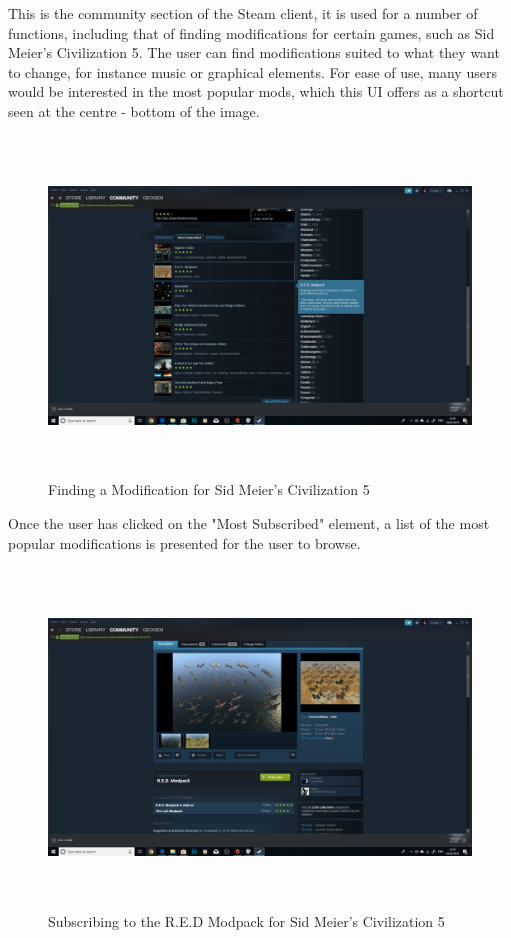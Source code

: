This is the community section of the Steam client, it is used for a number of functions, including that of finding modifications for certain games, such as Sid Meier's Civilization 5. The user can find modifications suited to what they want to change, for instance music or graphical elements. For ease of use, many users would be interested in the most popular mods, which this UI offers as a shortcut seen at the centre - bottom of the image. 

\begin{figure}[H]
\includegraphics[width=16cm,height=9cm]{Screenshots/SteamScreenShots/FindingAModForCivilisation5.png}
\caption{Finding a Modification for Sid Meier's Civilization 5}    
\end{figure}

Once the user has clicked on the "Most Subscribed" element, a list of the most popular modifications is presented for the user to browse.

\begin{figure}[H]
\includegraphics[width=16cm,height=9cm]{Screenshots/SteamScreenShots/SubscribingToSelectedMod.png}
\caption{Subscribing to the R.E.D Modpack for Sid Meier's Civilization 5}    
\end{figure}

